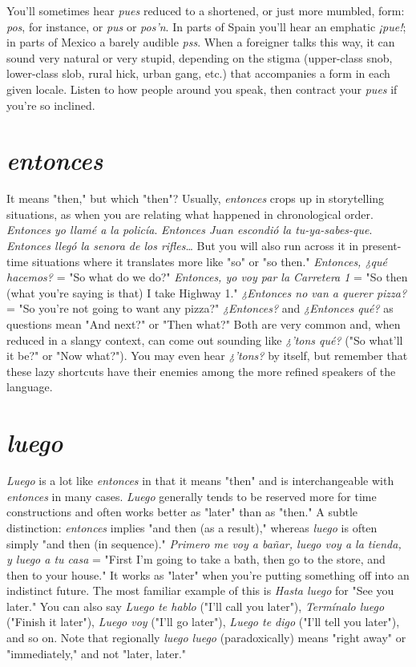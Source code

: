 \documentclass[14pt,a4paper,oneside]{memoir}
\begin{document}
You'll sometimes hear \emph{pues} reduced to a shortened, or just
more mumbled, form: \emph{pos}, for instance, or \emph{pus} or \emph{pos'n}. In parts of
Spain you'll hear an emphatic \emph{¡pue!}; in parts of Mexico a barely audible \emph{pss}. When a foreigner talks this way, it can sound very natural
or very stupid, depending on the stigma (upper-class snob, lower-class
slob, rural hick, urban gang, etc.) that accompanies a form in each
given locale. Listen to how people around you speak, then contract
your \emph{pues} if you're so inclined.

\section{\emph{entonces}}

It means "then," but which "then"? Usually, \emph{entonces} crops
up in storytelling situations, as when you are relating what happened
in chronological order. \emph{Entonces yo llamé a la policía}. \emph{Entonces Juan
	escondió la tu-ya-sabes-que}. \emph{Entonces llegó la senora de los rifles}\ldots{}
But you will also run across it in present-time situations where it
translates more like "so" or "so then." \emph{Entonces, ¿qué hacemos?} = "So
what do we do?" \emph{Entonces, yo voy par la Carretera 1} = "So then (what
you're saying is that) I take Highway 1." \emph{¿Entonces no van a querer
	pizza?} = "So you're not going to want any pizza?" \emph{¿Entonces?} and \emph{¿Entonces qué?} as questions mean "And next?" or "Then what?" Both are
very common and, when reduced in a slangy context, can come out
sounding like \emph{¿'tons qué?} ("So what'll it be?" or "Now what?").
You
may even hear \emph{¿'tons?} by itself, but remember that these lazy shortcuts
have their enemies among the more refined speakers of the language.

\section{\emph{luego}}

\emph{Luego} is a lot like \emph{entonces} in that it means "then" and is interchangeable with \emph{entonces} in many cases. \emph{Luego} generally tends
to be reserved more for time constructions and often works better as
"later" than as "then." A subtle distinction: \emph{entonces} implies "and
then (as a result)," whereas \emph{luego} is often simply "and then (in sequence)." \emph{Primero me voy a bañar, luego voy a la tienda, y luego a tu
	casa} = "First I'm going to take a bath, then go to the store, and then
to your house." It works as "later" when you're putting something off
into an indistinct future. The most familiar example of this is \emph{Hasta
	luego} for "See you later." You can also say \emph{Luego te hablo} ("I'll call
you later"), \emph{Termínalo luego} ("Finish it later"), \emph{Luego voy} ("I'll go
later"), \emph{Luego te digo} ("I'll tell you later"), and so on. Note that regionally \emph{luego luego} (paradoxically) means "right away" or "immediately,"
and not "later, later."
\end{document}
